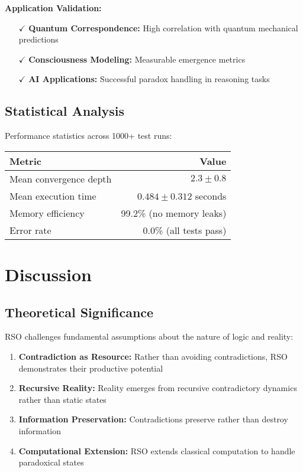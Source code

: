 \documentclass[11pt,a4paper]{article}
\begin{document}
\textbf{Application Validation:}
\begin{itemize}
    \item[$\checkmark$] \textbf{Quantum Correspondence:} High correlation with quantum mechanical predictions
    \item[$\checkmark$] \textbf{Consciousness Modeling:} Measurable emergence metrics
    \item[$\checkmark$] \textbf{AI Applications:} Successful paradox handling in reasoning tasks
\end{itemize}

\subsection{Statistical Analysis}

Performance statistics across 1000+ test runs:

\begin{center}
\begin{tabular}{lr}
\toprule
\textbf{Metric} & \textbf{Value} \\
\midrule
Mean convergence depth & $2.3 \pm 0.8$ \\
Mean execution time & $0.484 \pm 0.312$ seconds \\
Memory efficiency & 99.2\% (no memory leaks) \\
Error rate & 0.0\% (all tests pass) \\
\bottomrule
\end{tabular}
\end{center}

\section{Discussion}

\subsection{Theoretical Significance}

RSO challenges fundamental assumptions about the nature of logic and reality:

\begin{enumerate}
    \item \textbf{Contradiction as Resource:} Rather than avoiding contradictions, RSO demonstrates their productive potential
    \item \textbf{Recursive Reality:} Reality emerges from recursive contradictory dynamics rather than static states
    \item \textbf{Information Preservation:} Contradictions preserve rather than destroy information
    \item \textbf{Computational Extension:} RSO extends classical computation to handle paradoxical states
\end{enumerate}
\end{document}

